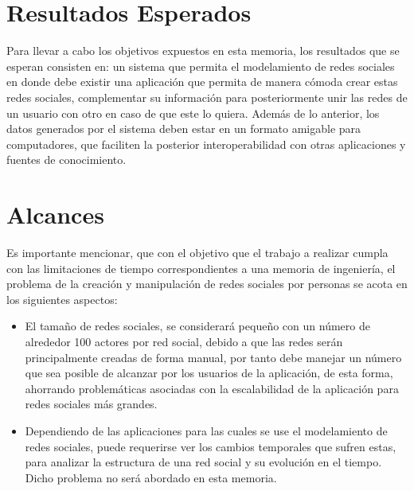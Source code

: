 
\section{Resultados Esperados} %
\label{sec:resultados_esperados}

Para llevar a cabo los objetivos expuestos en esta memoria, los resultados que se esperan consisten en: un sistema que permita el modelamiento de redes sociales en donde debe existir una aplicación que permita de manera cómoda crear estas redes sociales, complementar su información para posteriormente unir las redes de un usuario con otro en caso de que este lo quiera. Además de lo anterior, los datos generados por el sistema deben estar en un formato amigable para computadores, que faciliten la posterior interoperabilidad con otras aplicaciones y fuentes de conocimiento.


\section{Alcances} %
\label{sec:alcances}
% 

Es importante mencionar, que con el objetivo que el trabajo a realizar cumpla con las limitaciones de tiempo correspondientes a una memoria de ingeniería, el problema de la creación y manipulación de redes sociales por personas se acota en los siguientes aspectos:

\begin{itemize}
  \item El tamaño de redes sociales, se considerará pequeño con un número de alrededor 100 actores por red social, debido a que las redes serán principalmente creadas de forma manual, por tanto debe manejar un número que sea posible de alcanzar por los usuarios de la aplicación, de esta forma, ahorrando problemáticas asociadas con la escalabilidad de la aplicación para redes sociales más grandes.
  \item Dependiendo de las aplicaciones para las cuales se use el modelamiento de redes sociales, puede requerirse ver los cambios temporales que sufren estas, para analizar la estructura de una red social y su evolución en el tiempo. Dicho problema no será abordado en esta memoria.
\end{itemize}
